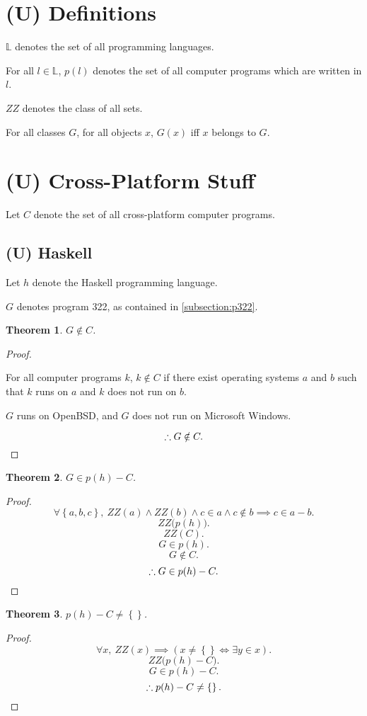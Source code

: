 \documentclass{article}
\newtheorem{thm}{Theorem}
\begin{document}
	\section{(U) Definitions}
		$\mathbb L$ denotes the set of all programming languages.

		For all $l \in \mathbb L$, $p(l)$ denotes the set of all computer
		programs which are written in $l$.

		$\mathit{ZZ}$ denotes the class of all sets.

		For all classes $G$, for all objects $x$, $G(x)$ iff $x$ belongs to
		$G$.
	\section{(U) Cross-Platform Stuff}
			Let $C$ denote the set of all cross-platform computer programs.
		\subsection{(U) Haskell}
			Let $h$ denote the Haskell programming language.

			$G$ denotes program 322, as contained in \cref{subsection:p322}.
			\begin{thm}
				$G \notin C$.
			\end{thm}
			\begin{proof}
				${}$

				For all computer programs $k$, $k \notin C$ if there exist
				operating systems $a$ and $b$ such that $k$ runs on $a$ and
				$k$ does not run on $b$.

				$G$ runs on OpenBSD, and $G$ does not run on Microsoft Windows.

				\[
					\therefore G \notin C.\qedhere
				\]
			\end{proof}
			\begin{thm}
				$G \in p(h) - C$.
			\end{thm}
			\begin{proof}
				\[
					\forall \left\{a,b,c\right\},\ 
					\mathit{ZZ}(a) \land \mathit{ZZ}(b) \land
					c \in a \land c \notin b \implies c \in a - b.
				\]
				\[
					\mathit{ZZ}\big(p(h)\big).
				\]
				\[
					\mathit{ZZ}(C).
				\]
				\[
					G \in p(h).
				\]
				\[
					G \notin C.
				\]
				\[
					\therefore G \in p(h) - C.\qedhere
				\]
			\end{proof}
			\begin{thm}
				$p(h) - C \neq \left\{\right\}$.
			\end{thm}
			\begin{proof}
				\[
					\forall x,\ 
					\mathit{ZZ}(x) \implies 
					\left(x \neq \left\{\right\} \iff \exists y \in x\right).
				\]
				\[
					\mathit{ZZ}\big(p(h) - C\big).
				\]
				\[
					G \in p(h) - C.
				\]
				\[
					\therefore p(h) - C \neq \left\{\right\}.\qedhere
				\]
			\end{proof}
\end{document}
